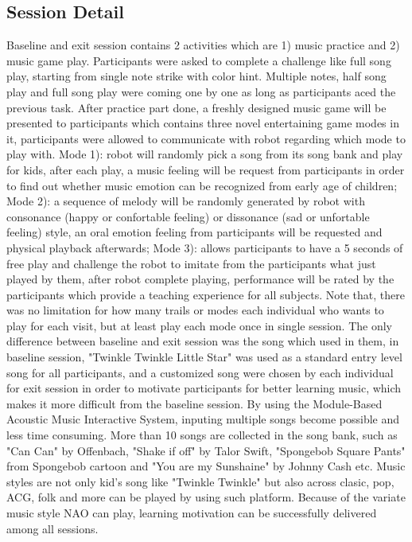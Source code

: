\subsection{Session Detail}
Baseline and exit session contains 2 activities which are 1) music practice and 2) music game play.
Participants were asked to complete a challenge like full song play, starting from single note strike
with color hint. Multiple notes, half song play and full song play were coming one by one as long as 
participants aced the previous task. After practice part done, a freshly designed music game will be 
presented to participants which contains three novel entertaining game modes in it, participants
were allowed to communicate with robot regarding which mode to play with. Mode 1): robot will randomly
pick a song from its song bank and play for kids, after each play, a music feeling will be request from 
participants in order to find out whether music emotion can be recognized from early age of children; 
Mode 2): a sequence of melody will be randomly generated by robot with consonance (happy or confortable feeling) 
or dissonance (sad or unfortable feeling) style, an oral emotion feeling from participants will be requested 
and physical playback afterwards; Mode 3): allows participants to have a 5 seconds of free play and challenge the robot to
imitate from the participants what just played by them, after robot complete playing, performance will be rated by
the participants which provide a teaching experience for all subjects. Note that, there was no limitation 
for how many trails or modes each individual who wants to play for each visit, but at least play each mode 
once in single session. The only difference between baseline and exit session was the song which used in them, 
in baseline session, "Twinkle Twinkle Little Star" was used as a standard entry level song for all 
participants, and a customized song were chosen by each individual for exit session in order to 
motivate participants for better learning music, which makes it more difficult from the baseline session. 
By using the Module-Based Acoustic Music Interactive System, inputing multiple songs become possible and
less time consuming. More than 10 songs are collected in the song bank, such as "Can Can" by Offenbach, 
"Shake if off" by Talor Swift, "Spongebob Square Pants" from Spongebob cartoon and "You are my Sunshaine"
by Johnny Cash etc. Music styles are not only kid's song like "Twinkle Twinkle" but also across clasic, 
pop, ACG, folk and more can be played by using such platform. Because of the variate music style NAO
can play, learning motivation can be successfully delivered among all sessions.\\

